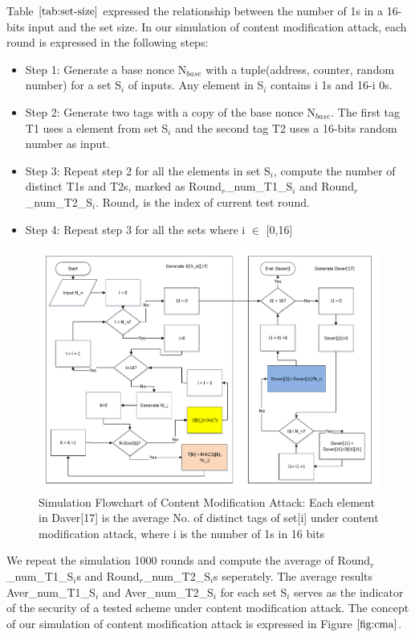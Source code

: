 \documentclass{article}
\begin{document}
Table $\ref{tab:set-size}$ expressed the relationship between the number of 1s in a 16-bits input and the set size. In our simulation of content modification attack, each round is expressed in the following steps:
\begin{itemize}
	\item Step 1: Generate a base nonce N$_{base}$ with a tuple(address, counter, random number) for a set S$_i$ of inputs. Any element in S$_i$ contains i 1s and 16-i 0s.
	\item Step 2: Generate two tags with a copy of the base nonce N$_{base}$. The first tag T1 uses a element from set S$_i$  and the second tag T2 uses a 16-bits random number as input. 
	\item Step 3: Repeat step 2 for all the elements in set S$_i$, compute the number of distinct T1s and T2s, marked as Round$_r$\_num\_T1\_S$_i$ and Round$_r$\_num\_T2\_S$_i$. Round$_r$ is the index of current test round.
	\item Step 4: Repeat step 3 for all the sets where i $\in$ [0,16] 
\end{itemize}
\begin{figure}[htbp]
 \centering
 \includegraphics[scale=0.4]{./diagrams/nonceCollide.pdf}
 \caption{Simulation Flowchart of Content Modification Attack: Each element in Daver[17] is the average No. of distinct tags of set[i] under content modification attack, where i is the number of 1s in 16 bits}
 \label{fig:cma}
\end{figure}

We repeat the simulation 1000 rounds and compute the average of Round$_r$\_num\_T1\_S$_i$s and Round$_r$\_num\_T2\_S$_i$s seperately. The average results   Aver\_num\_T1\_S$_i$ and Aver\_num\_T2\_S$_i$ for each set S$_i$ serves as the indicator of the security of a tested scheme under content modification attack.
The concept of our simulation of content modification attack is expressed in Figure $\ref{fig:cma}$.
\end{document}
